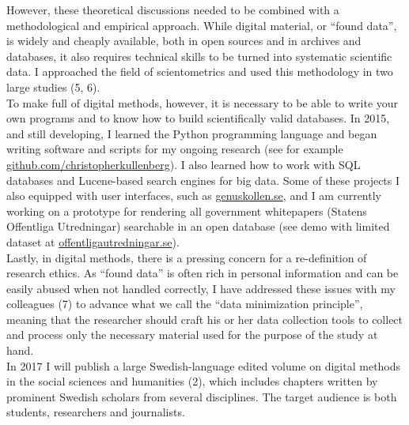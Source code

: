\documentclass[a4paper,11pt,oneside]{article}
\begin{document}
    However, these theoretical discussions needed to be combined with a methodological and
    empirical approach. While digital material, or ``found data'', is widely and cheaply
    available, both in open sources and in archives and databases, it also requires
    technical skills to be turned into systematic scientific data. I approached the
    field of scientometrics and used this methodology in two large studies (5, 6).\\

    To make full of digital methods, however, it is necessary to be able to write
    your own programs and to know how to build scientifically valid databases. In
    2015, and still developing, I learned the Python programming language and began
    writing software and scripts for my ongoing research (see for example
    \href{https://github.com/christopherkullenberg}{github.com/christopherkullenberg}).
    I also learned how to work with SQL databases and Lucene-based search engines for big data.
    Some of these projects I also equipped with user interfaces, such as
    \href{https://genuskollen.se/}{genuskollen.se}, and I am currently working
    on a prototype for rendering all government whitepapers (Statens Offentliga Utredningar)
    searchable in an open database (see demo with limited dataset at
     \href{http://offentligautredningar.se/}{offentligautredningar.se}).\\

     Lastly, in digital methods, there is a pressing concern for a re-definition
     of research ethics. As ``found data'' is often rich in personal information
     and can be easily abused when not handled correctly, I have addressed these
     issues with my colleagues (7) to advance what we call the ``data minimization principle'',
     meaning that the researcher should craft his or her data collection tools
     to collect and process only the necessary material used for the purpose of
     the study at hand.\\

     In 2017 I will publish a large Swedish-language edited volume on digital methods in the social
     sciences and humanities (2), which includes chapters written by prominent Swedish
     scholars from several disciplines. The target audience is both students,
     researchers and journalists.\\
\end{document}
